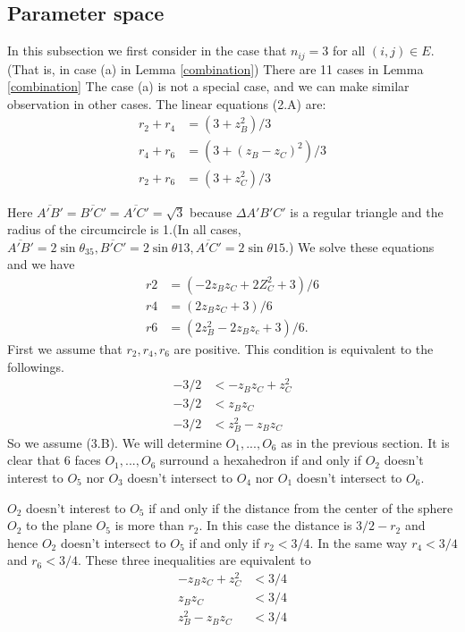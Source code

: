 \documentclass[dvipdfmx]{interact}
\theoremstyle{plain}%
\theoremstyle{definition}
\theoremstyle{remark}
\theoremstyle{problemstyle}
\begin{document}
\subsection{Parameter space}\label{paramSpace}
In this subsection we first consider in the case that $n_{ij} = 3$ for all
$(i, j) \in E$. (That is, in case (a) in Lemma \ref{combination}) There are 11 cases
in Lemma \ref{combination} The case (a) is not a special case, and we can make
similar observation in other cases.
The linear equations (2.A) are:
\begin{align*}
 r_2 + r_4 &= (3 + z_B^2) / 3 \\
 r_4 + r_6 &= (3 + (z_B - z_C)^2 ) / 3 \\
 r_2 + r_6 &= (3 + z_C^2) / 3
\end{align*}

Here $\overline{A'B'} = \overline{B'C'} = \overline{A'C'} = \sqrt{3}$
because $\Delta{A'B'C'}$ is a regular triangle and the radius of the
circumcircle is 1.(In all cases, $\overline{A'B'} = 2\sin\theta_{35},
\overline{B'C'} = 2\sin\theta{13}, \overline{A'C'} = 2\sin\theta{15}$.)
We solve these equations and we have 
\begin{align}
 r2 &= (-2z_Bz_C + 2Z^2_C + 3) / 6 \\
 r4 &= (2z_Bz_C + 3) / 6 \\
 r6 &= (2z^2_B - 2z_Bz_c + 3) / 6.
\end{align}
First we assume that $r_2, r_4, r_6$ are positive. This condition is
equivalent to the followings.
\begin{align}
 -3 / 2 &< -z_Bz_C + z^2_C\\
 -3 / 2 &< z_Bz_C \\
 -3 / 2 &< z^2_B - z_Bz_C
\end{align}
So we assume (3.B). We will determine $O_1, ... , O_6$ as in the
previous section. It is clear that 6 faces $O_1, ... , O_6$ surround
a hexahedron if and only if $O_2$ doesn't interest to $O_5$ nor $O_3$
doesn't intersect to $O_4$ nor $O_1$ doesn't intersect to $O_6$.

$O_2$ doesn't interest to $O_5$ if and only if the distance from the center
of the sphere $O_2$ to the plane $O_5$ is more than $r_2$. In this case
the distance is $3 / 2 - r_2$ and hence $O_2$ doesn't intersect to $O_5$
if and only if $r_2 < 3/4$. In the same way $r_4 < 3/4$ and $r_6 <
3/4$. These three inequalities are equivalent to
\begin{align}
 -z_Bz_C + z^2_C &< 3 / 4\\
 z_Bz_C &< 3 / 4 \\
 z^2_B - z_B z_C &< 3/ 4
\end{align}
\end{document}
